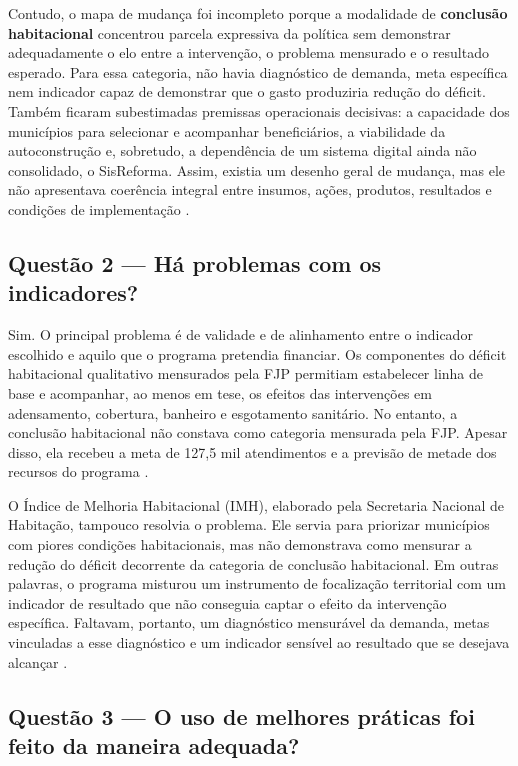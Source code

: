 \documentclass[12pt,a4paper]{article}
\begin{document}
Contudo, o mapa de mudança foi incompleto porque a modalidade de \textbf{conclusão habitacional} concentrou parcela expressiva da política sem demonstrar adequadamente o elo entre a intervenção, o problema mensurado e o resultado esperado. Para essa categoria, não havia diagnóstico de demanda, meta específica nem indicador capaz de demonstrar que o gasto produziria redução do déficit. Também ficaram subestimadas premissas operacionais decisivas: a capacidade dos municípios para selecionar e acompanhar beneficiários, a viabilidade da autoconstrução e, sobretudo, a dependência de um sistema digital ainda não consolidado, o SisReforma. Assim, existia um desenho geral de mudança, mas ele não apresentava coerência integral entre insumos, ações, produtos, resultados e condições de implementação \parencite[p. 96]{santos2020cartao}.

\subsection*{Questão 2 — Há problemas com os indicadores?}
\label{sec:orgaa76662}

Sim. O principal problema é de validade e de alinhamento entre o indicador escolhido e aquilo que o programa pretendia financiar. Os componentes do déficit habitacional qualitativo mensurados pela FJP permitiam estabelecer linha de base e acompanhar, ao menos em tese, os efeitos das intervenções em adensamento, cobertura, banheiro e esgotamento sanitário. No entanto, a conclusão habitacional não constava como categoria mensurada pela FJP. Apesar disso, ela recebeu a meta de 127,5 mil atendimentos e a previsão de metade dos recursos do programa \parencite[p. 95]{santos2020cartao}.

O Índice de Melhoria Habitacional (IMH), elaborado pela Secretaria Nacional de Habitação, tampouco resolvia o problema. Ele servia para priorizar municípios com piores condições habitacionais, mas não demonstrava como mensurar a redução do déficit decorrente da categoria de conclusão habitacional. Em outras palavras, o programa misturou um instrumento de focalização territorial com um indicador de resultado que não conseguia captar o efeito da intervenção específica. Faltavam, portanto, um diagnóstico mensurável da demanda, metas vinculadas a esse diagnóstico e um indicador sensível ao resultado que se desejava alcançar \parencite[p. 96]{santos2020cartao}.

\subsection*{Questão 3 — O uso de melhores práticas foi feito da maneira adequada?}
\label{sec:orgca7ec8b}
\end{document}
